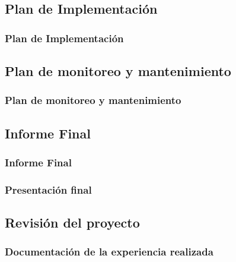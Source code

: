 \subsection{Plan de Implementación}
    \subsubsection{Plan de Implementación}
\subsection{Plan de monitoreo y mantenimiento}
    \subsubsection{Plan de monitoreo y mantenimiento}
\subsection{Informe Final}
    \subsubsection{Informe Final}
    \subsubsection{Presentación final}
\subsection{Revisión del proyecto}
    \subsubsection{Documentación de la experiencia realizada}